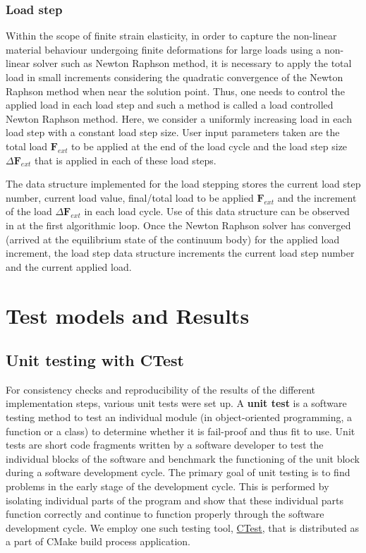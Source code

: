 \subsubsection{Load step}
Within the scope of finite strain elasticity, in order to capture the non-linear material behaviour undergoing finite deformations for large loads using a non-linear solver such as Newton Raphson method, it is necessary to apply the total load in small increments considering the quadratic convergence of the Newton Raphson method when near the solution point. Thus, one needs to control the applied load in each load step and such a method is called a load controlled Newton Raphson method. Here, we consider a uniformly increasing load in each load step with a constant load step size. User input parameters taken are the total load $\mathbf{F}_{ext}$ to be applied at the end of the load cycle and the load step size $\Delta \mathbf{F}_{ext}$ that is applied in each of these load steps. \par 
The data structure implemented for the load stepping stores the current load step number, current load value, final/total load to be applied $\mathbf{F}_{ext}$ and the increment of the load $\Delta \mathbf{F}_{ext}$ in each load cycle. Use of this data structure can be observed in  at the first algorithmic loop. Once the Newton Raphson solver has converged (arrived at the equilibrium state of the continuum body) for the applied load increment, the load step data structure increments the current load step number and the current applied load.
 
\section{Test models and Results}

\subsection{Unit testing with CTest}
For consistency checks and reproducibility of the results of the different implementation steps, various unit tests were set up. A \textbf{unit test} is a software testing method to test an individual module (in object-oriented programming, a function or a class) to determine whether it is fail-proof and thus fit to use. Unit tests are short code fragments written by a software developer to test the individual blocks of the software and benchmark the functioning of the unit block during a software development cycle. The primary goal of unit testing is to find problems in the early stage of the development cycle. This is performed by isolating individual parts of the program and show that these individual parts function correctly and continue to function properly through the software development cycle. We employ one such testing tool, \href{https://gitlab.kitware.com/cmake/community/wikis/doc/ctest/Testing-With-CTest}{CTest}, that is distributed as a part of CMake build process application. \par 

